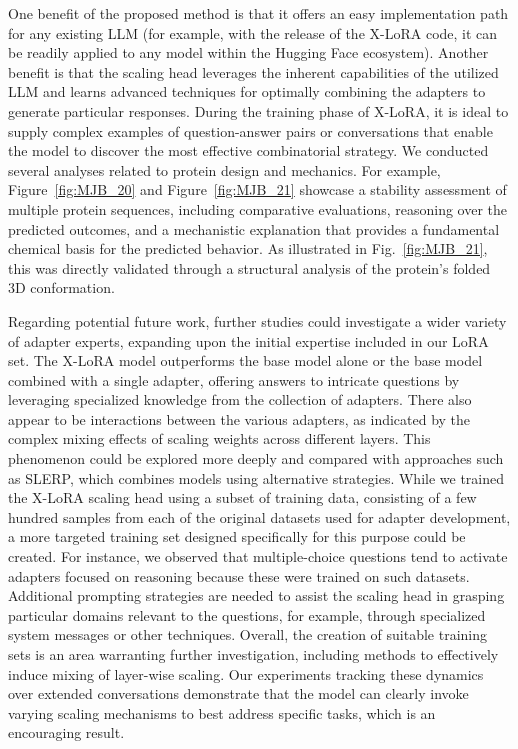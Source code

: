 One benefit of the proposed method is that it offers an easy implementation path for any existing LLM (for example, with the release of the X-LoRA code, it can be readily applied to any model within the Hugging Face ecosystem). Another benefit is that the scaling head leverages the inherent capabilities of the utilized LLM and learns advanced techniques for optimally combining the adapters to generate particular responses. During the training phase of X-LoRA, it is ideal to supply complex examples of question-answer pairs or conversations that enable the model to discover the most effective combinatorial strategy. We conducted several analyses related to protein design and mechanics. For example, Figure~\ref{fig:MJB_20} and Figure~\ref{fig:MJB_21} showcase a stability assessment of multiple protein sequences, including comparative evaluations, reasoning over the predicted outcomes, and a mechanistic explanation that provides a fundamental chemical basis for the predicted behavior. As illustrated in Fig.~\ref{fig:MJB_21}, this was directly validated through a structural analysis of the protein’s folded 3D conformation.

Regarding potential future work, further studies could investigate a wider variety of adapter experts, expanding upon the initial expertise included in our LoRA set. The X-LoRA model outperforms the base model alone or the base model combined with a single adapter, offering answers to intricate questions by leveraging specialized knowledge from the collection of adapters. There also appear to be interactions between the various adapters, as indicated by the complex mixing effects of scaling weights across different layers. This phenomenon could be explored more deeply and compared with approaches such as SLERP, which combines models using alternative strategies. While we trained the X-LoRA scaling head using a subset of training data, consisting of a few hundred samples from each of the original datasets used for adapter development, a more targeted training set designed specifically for this purpose could be created. For instance, we observed that multiple-choice questions tend to activate adapters focused on reasoning because these were trained on such datasets. Additional prompting strategies are needed to assist the scaling head in grasping particular domains relevant to the questions, for example, through specialized system messages or other techniques. Overall, the creation of suitable training sets is an area warranting further investigation, including methods to effectively induce mixing of layer-wise scaling. Our experiments tracking these dynamics over extended conversations demonstrate that the model can clearly invoke varying scaling mechanisms to best address specific tasks, which is an encouraging result.

